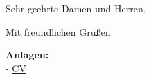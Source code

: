 \begin{coverletter}

    \displayCompanyAdress

    \vspace{10pt}

    \displaySubject

    \vspace{10pt}

    Sehr geehrte Damen und Herren,

    \vspace{10pt}

    \lipsum[1-3]

    \vspace{10pt}

    Mit freundlichen Grüßen
    \displaysignature

    \vfill
    \textbf{Anlagen:}\\
    \-- \hyperref[cvPage.2]{CV}

\end{coverletter}

